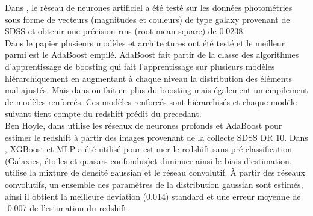 Dans \cite{adrian}, le réseau de neurones artificiel a été testé sur les données photométries sous forme de vecteurs (magnitudes et couleurs) de type galaxy provenant de SDSS et obtenir une précision rms (root mean square) de 0.0238.\\
Dans le papier \cite{stack} plusieurs modèles et architectures ont été testé et le meilleur parmi est le AdaBoost empilé. AdaBoost fait partir de la classe des algorithmes d'apprentissage de boosting qui fait l'apprentissage sur plusieurs modèles hiérarchiquement en augmentant à chaque niveau la distribution des éléments mal ajustés. Mais dans \cite{stack} on fait en plus du boosting mais également un empilement de modèles renforcés. Ces modèles renforcés sont hiérarchisés et chaque modèle suivant tient compte du redshift prédit du precedant.\\
Ben Hoyle, dans \cite{ben} utilise les réseaux de neurones profonds et AdaBoost pour estimer le redshift à partir des images provenant de la collecte SDSS DR 10. Dans \cite{meuphirim}, XGBoost et MLP a été utilisé pour estimer le redshift sans pré-classification (Galaxies, étoiles et quasars confondus)et diminuer ainsi  le biais d'estimation. \cite{isanto} utilise la mixture de densité gaussian et le réseau convolutif. À partir des réseaux convolutifs, un ensemble des paramètres de la distribution gaussian sont estimés, ainsi il obtient la meilleure deviation (0.014) standard et une erreur moyenne de -0.007 de l'estimation du redshift. 



























